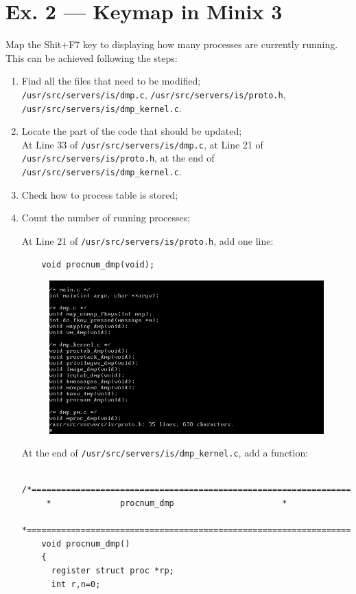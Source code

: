 \documentclass[a4paper]{article}
\begin{document}
\section*{Ex. 2 — Keymap in Minix 3}
Map the Shit+F7 key to displaying how many processes are currently running.\\
This can be achieved following the steps:\\
\begin{enumerate}
    \item Find all the files that need to be modified;\\
    \texttt{/usr/src/servers/is/dmp.c}, \texttt{/usr/src/servers/is/proto.h}, \texttt{/usr/src/servers/is/dmp\_kernel.c}.
    \item Locate the part of the code that should be updated;\\
    At Line 33 of \texttt{/usr/src/servers/is/dmp.c}, at Line 21 of \texttt{/usr/src/servers/is/proto.h}, at the end of \texttt{/usr/src/servers/is/dmp\_kernel.c}.
    \item Check how to process table is stored;
    \item Count the number of running processes;

    At Line 21 of \texttt{/usr/src/servers/is/proto.h}, add one line:
    \begin{verbatim}
    void procnum_dmp(void);
    \end{verbatim}
    \begin{figure}[H]
        \centering
        \includegraphics[width=1\textwidth]{3.png}
    \end{figure}
    At the end of \texttt{/usr/src/servers/is/dmp\_kernel.c}, add a function:
    \begin{verbatim}
    /*===========================================================================*
     *				procnum_dmp  				     *
     *===========================================================================*/
    void procnum_dmp()
    {
      register struct proc *rp;
      int r,n=0;
    

\end{verbatim}
\end{enumerate}
\end{document}
